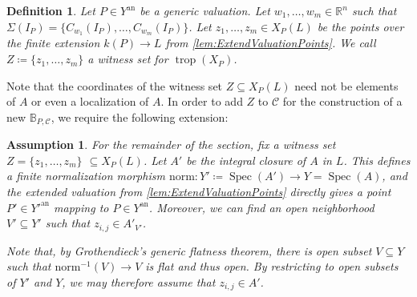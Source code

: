 \documentclass[12pt,reqno,a4paper]{amsart}
\theoremstyle{theoremstyle}
\theoremstyle{examplestyle}
\newtheorem{definition}[theorem]{Definition}
\newtheorem{assumption}[theorem]{Assumption}
\theoremstyle{algorithmstyle}
\newcommand{\RR}{\mathbb{R}}
\newcommand{\an}{{\mathrm{an}}}
\DeclareMathOperator{\Spec}{Spec}
\DeclareMathOperator{\Trop}{trop}
\begin{document}
%

\begin{definition}\label{def:AlgebraicWitnesses}
  Let $P\in Y^{\an}$ be a generic valuation.  Let $w_1,\dots,w_m\in\RR^n$ such that $\Sigma(I_P)=\{C_{w_1}(I_P),\dots,C_{w_m}(I_P)\}$.  Let $z_{1},\dots ,z_{m}\in X_{P}(L)$ be the points over the finite extension $k(P)\to L$ from \cref{lem:ExtendValuationPoints}. We call $Z\coloneqq \{z_1,\dots,z_m\}$ a \emph{witness set} for $\Trop(X_{P})$.
\end{definition}

Note that the coordinates of the witness set $Z\subseteq X_P(L)$ need not be elements of $A$ or even a localization of $A$.  In order to add $Z$ to $\mathcal C$ for the construction of a new $\mathbb{B}_{P,\mathcal{C}}$, we require the following extension:

\begin{assumption}
  \label{assumption:witnessSet}
  For the remainder of the section, fix a witness set $Z=\{z_1,\dots,z_m\}$ $\subseteq X_P(L)$.  Let $A'$ be the integral closure of $A$ in $L$. This defines a finite normalization morphism $\mathrm{norm}\colon Y'\coloneqq \Spec(A')\to Y=\Spec(A)$, and the extended valuation from \cref{lem:ExtendValuationPoints} directly gives a point $P'\in Y'^{\an}$ mapping to $P\in Y^{\an}$.  Moreover, we can find an open neighborhood $V'\subseteq Y'$ such that $z_{i,j}\in A'_{V'}$. %

  Note that, by Grothendieck's generic flatness theorem, there is open subset $V\subseteq Y$ such that $\mathrm{norm}^{-1}(V)\to V$ is flat and thus open.  By restricting to open subsets of $Y'$ and $Y$, we may therefore assume that $z_{i,j}\in A'$.
\end{assumption}
\end{document}
